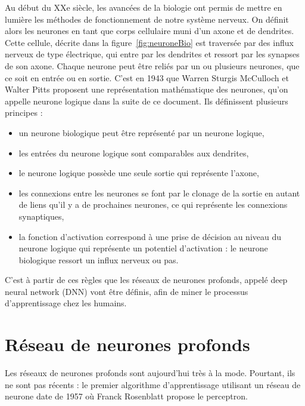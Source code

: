 
Au début du XXe siècle, les avancées de la biologie ont permis de mettre en lumière les méthodes de fonctionnement de notre système nerveux. On définit alors les neurones en tant que corps cellulaire muni d’un axone et de dendrites. Cette cellule, décrite dans la figure~\ref{fig:neuroneBio} est traversée par des influx nerveux de type électrique, qui entre par les dendrites et ressort par les synapses de son axone. Chaque neurone peut être reliés par un ou plusieurs neurones, que ce soit en entrée ou en sortie.
C'est en 1943 que Warren Sturgis McCulloch et Walter Pitts proposent une représentation mathématique des neurones, qu'on appelle neurone logique dans la suite de ce document. Ils définissent plusieurs principes :
\begin{itemize}
  \item un neurone biologique peut être représenté par un neurone logique,
  \item les entrées du neurone logique sont comparables aux dendrites,
  \item le neurone logique possède une seule sortie qui représente l'axone,
  \item les connexions entre les neurones se font par le clonage de la sortie en autant de liens qu'il y a de prochaines neurones, ce qui représente les connexions synaptiques,
  \item la fonction d'activation correspond à une prise de décision au niveau du neurone logique qui représente un potentiel d'activation : le neurone biologique ressort un influx nerveux ou pas.
\end{itemize}
C'est à partir de ces règles que les réseaux de neurones profonds, appelé deep neural network (DNN) vont être définis, afin de miner le processus d'apprentissage chez les humains.

\section{Réseau de neurones profonds}
Les réseaux de neurones profonds sont aujourd'hui très à la mode. Pourtant, ils ne sont pas récents : le premier algorithme d'apprentissage utilisant un réseau de neurone date de 1957 où Franck Rosenblatt propose le perceptron.

